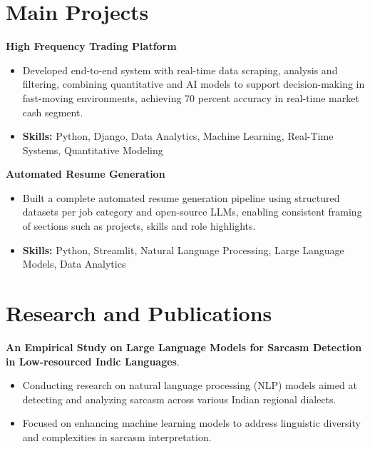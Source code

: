 \documentclass[a4paper,11pt]{article}
\begin{document}
\section{\textbf{Main Projects}}

\vspace{1mm}
  \textbf{High Frequency Trading Platform  }
\vspace{-1.5mm} %
\begin{itemize}
  \item Developed end-to-end system with real-time data scraping, analysis and filtering, combining quantitative and AI models to support decision-making in fast-moving environments, achieving 70 percent accuracy in real-time market cash segment.
\vspace{-3mm}
  \item \textbf{Skills:} Python, Django, Data Analytics, Machine Learning, Real-Time Systems, Quantitative Modeling
\end{itemize}


\vspace{1mm}
   \textbf{Automated Resume Generation }
\vspace{-1.5mm} %
\begin{itemize}
  \item Built a complete automated resume generation pipeline using structured datasets per job category and open-source LLMs, enabling consistent framing of sections such as projects, skills and role highlights.
\vspace{-3mm}
  \item \textbf{Skills:} Python, Streamlit, Natural Language Processing, Large Language Models, Data Analytics
\end{itemize}



\section{\textbf{Research and Publications} \hfill }
\vspace{1mm}
  \textbf{An Empirical Study on Large Language Models for Sarcasm Detection in Low-resourced Indic Languages}.
\vspace{-1mm} %
\begin{itemize}
  \item Conducting research on natural language processing (NLP) models aimed at detecting and analyzing sarcasm across various Indian regional dialects.
\vspace{-3mm}
  \item Focused on enhancing machine learning models to address linguistic diversity and complexities in sarcasm interpretation.
\end{itemize}
\end{document}
